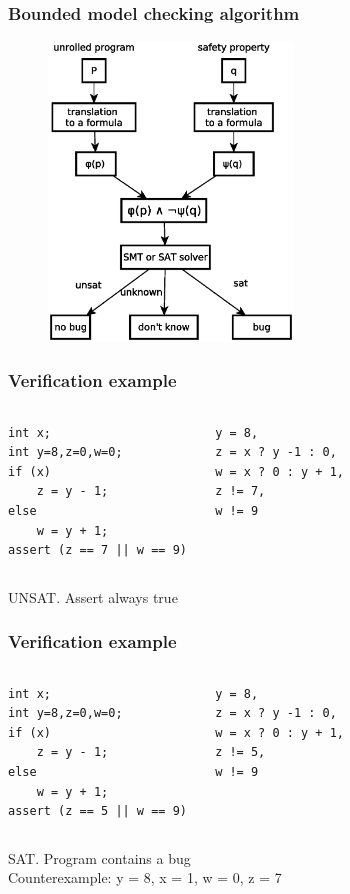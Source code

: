 \begin{frame}
\frametitle{Bounded model checking algorithm}
	\begin{figure}
	\includegraphics[width=65mm]{image/BMC}
	\end{figure}	
\end{frame}


\begin{frame}[fragile]\frametitle{Verification example} 
\center 
\begin{columns} 
\begin{lstlisting}[style=crs_cpp] 
int x; 
int y=8,z=0,w=0; 
if (x) 
	z = y - 1; 
else 
	w = y + 1; 
assert (z == 7 || w == 9) 
\end{lstlisting} 
\begin{lstlisting}[style = crs_llvm] 
y = 8, 
z = x ? y -1 : 0, 
w = x ? 0 : y + 1, 
z != 7, 
w != 9 
\end{lstlisting} 
\end{columns} 
	\begin{block}{}
	\centering
UNSAT. Assert always true
	\end{block}
\end{frame} 




\begin{frame}[fragile]\frametitle{Verification example} 
\center 
\begin{columns} 
\begin{lstlisting}[style=crs_cpp] 
int x; 
int y=8,z=0,w=0; 
if (x) 
	z = y - 1; 
else 
	w = y + 1; 
assert (z == 5 || w == 9) 
\end{lstlisting} 
\begin{lstlisting}[style = crs_llvm] 
y = 8, 
z = x ? y -1 : 0, 
w = x ? 0 : y + 1, 
z != 5, 
w != 9 
\end{lstlisting} 
\end{columns} 
	\begin{block}{}
	\centering
SAT. Program contains a bug \\
Counterexample: y = 8, x = 1, w = 0, z = 7
	\end{block}
\end{frame}


